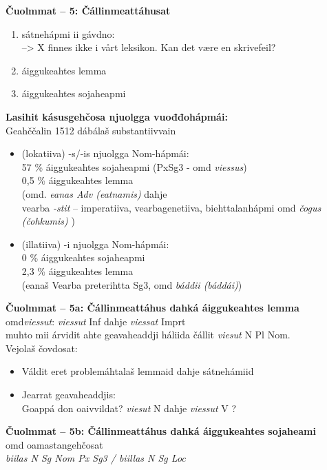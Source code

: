 \documentclass[landscape,norsk,11pt]{seminar}
\begin{document}
\begin{slide}
\newslide
\textbf{Čuolmmat -- 5: Čállinmeattáhusat} \\
\begin{enumerate}
\item sátnehápmi ii gávdno: \\ --> X finnes ikke i vårt leksikon. Kan det være en skrivefeil?
\item áiggukeahtes lemma
\item áiggukeahtes sojaheapmi
\end{enumerate}

\newslide
\textbf{Lasihit kásusgehčosa njuolgga vuođđohápmái:} \\
Geahččalin 1512 dábálaš substantiivvain 
\begin{itemize}
\item (lokatiiva) -s/-is njuolgga Nom-hápmái: \\
57 \% áiggukeahtes sojaheapmi (PxSg3 - omd \textit{viessus})  \\  0,5 \% áiggukeahtes lemma \\  (omd. \textit{eanas Adv (eatnamis)}  dahje \\ vearba \textit{-stit} -- imperatiiva, vearbagenetiiva, biehttalanhápmi omd \textit{čogus (čohkumis)} )
\item (illatiiva) -i njuolgga Nom-hápmái: \\
0 \% áiggukeahtes sojaheapmi \\  2,3 \% áiggukeahtes lemma \\ (eanaš Vearba preterihtta Sg3, omd \textit{báddii (báddái)}) 
\end{itemize}



\newslide
\textbf{Čuolmmat -- 5a: Čállinmeattáhus dahká áiggukeahtes lemma} \\
omd\textit{viessut}: \textit{viessut} Inf dahje \textit{viessat} Imprt \\
muhto mii árvidit ahte geavaheaddji háliida čállit \textit{viesut} N Pl Nom. \\
Vejolaš čovdosat:

\begin{itemize}
\item{Váldit eret problemáhtalaš lemmaid dahje sátnehámiid}
\item{Jearrat geavaheaddjis: \\ Goappá don oaivvildat? \textit{viesut}  N dahje \textit{viessut} V }?
\end{itemize}


\newslide
\textbf{Čuolmmat -- 5b: Čállinmeattáhus dahká áiggukeahtes sojaheami} \\
omd oamastangehčosat \\
\textit{biilas N Sg Nom Px Sg3 / biillas N Sg Loc} \\


\end{slide}
\end{document}

